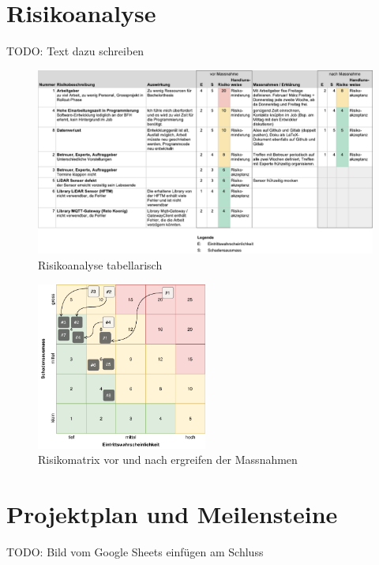 \section{Risikoanalyse}
TODO: Text dazu schreiben
\begin{figure}[H]
	\centering
	\includegraphics[width=1.0\textwidth]{img/risikoanalyse-tabelle.pdf}
	\caption{Risikoanalyse tabellarisch}
	\label{fig:risikoanalyse-tabelle}
\end{figure}
\begin{figure}[H]
	\centering
	\includegraphics[width=0.5\textwidth]{img/risikoanalyse-matrix.pdf}
	\caption{Risikomatrix vor und nach ergreifen der Massnahmen}
	\label{fig:risikoanalyse-matrix}
\end{figure}


\section{Projektplan und Meilensteine}
TODO: Bild vom Google Sheets einfügen am Schluss

